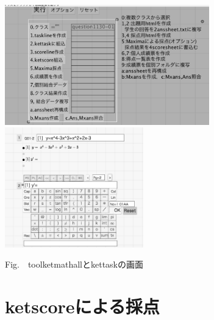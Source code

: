 \documentclass[a4j,12pt]{ujarticle}
\begin{document}
\begin{center}
\includegraphics[bb=0.00 0.00 792.00 464.00,height=52mm]{fig/toolketmathbw.pdf}
\hspace{5mm}%
\includegraphics[bb=0.00 0.00 803.00 694.00,height=52mm]{fig/kettaskbw.pdf}
\addtocounter{figure}{1}Fig.\thefigure\ \ toolketmathallとkettaskの画面\vspace{-1mm}
\end{center}

\section{ketscoreによる採点}
\end{document}
